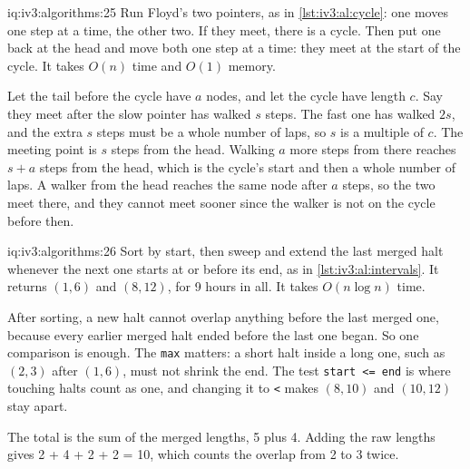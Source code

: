 \begin{solution}{iq:iv3:algorithms:25}
Run Floyd's two pointers, as in \cref{lst:iv3:al:cycle}: one moves one step at a time, the other two. If they meet, there is a cycle. Then put one back at the head and move both one step at a time: they meet at the start of the cycle. It takes $O(n)$ time and $O(1)$ memory.
\label{lst:iv3:al:cycle}

Let the tail before the cycle have $a$ nodes, and let the cycle have length $c$. Say they meet after the slow pointer has walked $s$ steps. The fast one has walked $2s$, and the extra $s$ steps must be a whole number of laps, so $s$ is a multiple of $c$. The meeting point is $s$ steps from the head. Walking $a$ more steps from there reaches $s + a$ steps from the head, which is the cycle's start and then a whole number of laps. A walker from the head reaches the same node after $a$ steps, so the two meet there, and they cannot meet sooner since the walker is not on the cycle before then.

\end{solution}

\begin{solution}{iq:iv3:algorithms:26}
Sort by start, then sweep and extend the last merged halt whenever the next one starts at or before its end, as in \cref{lst:iv3:al:intervals}. It returns $(1, 6)$ and $(8, 12)$, for 9 hours in all. It takes $O(n \log n)$ time.
\label{lst:iv3:al:intervals}

After sorting, a new halt cannot overlap anything before the last merged one, because every earlier merged halt ended before the last one began. So one comparison is enough. The \texttt{max} matters: a short halt inside a long one, such as $(2, 3)$ after $(1, 6)$, must not shrink the end. The test \texttt{start <= end} is where touching halts count as one, and changing it to \texttt{<} makes $(8, 10)$ and $(10, 12)$ stay apart.

The total is the sum of the merged lengths, 5 plus 4. Adding the raw lengths gives 2 + 4 + 2 + 2 = 10, which counts the overlap from 2 to 3 twice.

\end{solution}

